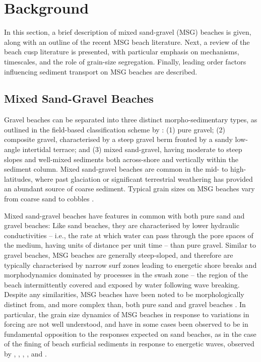 \chapter{Background}\label{Chapter:Background}

In this section, a brief description of mixed sand-gravel (MSG) beaches is given, along with an outline of the recent MSG beach literature. Next, a review of the beach cusp literature is presented, with particular emphasis on mechanisms, timescales, and the role of grain-size segregation. Finally, leading order factors influencing sediment transport on MSG beaches are described.

\section{Mixed Sand-Gravel Beaches}\label{subsection:msg} 

%

Gravel beaches can be separated into three distinct morpho-sedimentary types, as outlined in the field-based classification scheme by \citet{Jennings_Shulmeister2002}: (1) pure gravel; (2) composite gravel, characterised by a steep gravel berm fronted by a sandy low-angle intertidal terrace; and (3) mixed sand-gravel, having moderate to steep slopes and well-mixed sediments both across-shore and vertically within the sediment column. Mixed sand-gravel beaches are common in the mid- to high-latitudes, where past glaciation or significant terrestrial weathering has provided an abundant source of coarse sediment. Typical grain sizes on MSG beaches vary from coarse sand to cobbles \citep{Mason_Coates2001}. 

Mixed sand-gravel beaches have features in common with both pure sand and gravel beaches: Like sand beaches, they are characterised by lower hydraulic conductivities -- i.e., the rate at which water can pass through the pore spaces of the medium, having units of distance per unit time -- than pure gravel. Similar to gravel beaches, MSG beaches are generally steep-sloped, and therefore are typically characterised by narrow surf zones leading to energetic shore breaks and morphodynamics dominated by processes in the swash zone -- the region of the beach intermittently covered and exposed by water following wave breaking. Despite any similarities, MSG beaches have been noted to be morphologically distinct from, and more complex than, both pure sand and gravel beaches \citep{Kirk1980}. In particular, the grain size dynamics of MSG beaches in response to variations in forcing are not well understood, and have in some cases been observed to be in fundamental opposition to the responses expected on sand beaches, as in the case of the fining of beach surficial sediments in response to energetic waves, observed by \citet{Nordstrom_Jackson1993}, \citet{Pontee_etal2004}, \citet{Curtiss_etal2009}, \citet{Miller_etal2011}, and \citet{Hay_etal2014}.

